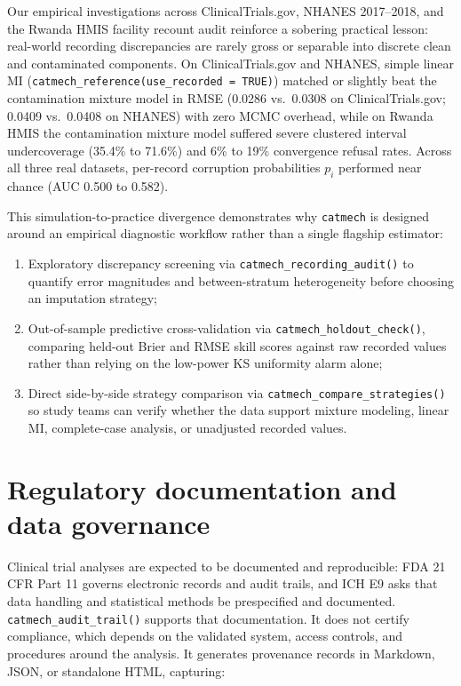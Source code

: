 \documentclass[
]{article}
\providecommand{\tightlist}{%
  \setlength{\itemsep}{0pt}\setlength{\parskip}{0pt}}
\begin{document}
Our empirical investigations across ClinicalTrials.gov, NHANES
2017--2018, and the Rwanda HMIS facility recount audit reinforce a
sobering practical lesson: real-world recording discrepancies are rarely
gross or separable into discrete clean and contaminated components. On
ClinicalTrials.gov and NHANES, simple linear MI
(\texttt{catmech\_reference(use\_recorded\ =\ TRUE)}) matched or
slightly beat the contamination mixture model in RMSE (0.0286 vs.~0.0308
on ClinicalTrials.gov; 0.0409 vs.~0.0408 on NHANES) with zero MCMC
overhead, while on Rwanda HMIS the contamination mixture model suffered
severe clustered interval undercoverage (35.4\% to 71.6\%) and 6\% to
19\% convergence refusal rates. Across all three real datasets,
per-record corruption probabilities \(p_i\) performed near chance (AUC
0.500 to 0.582).

This simulation-to-practice divergence demonstrates why \texttt{catmech}
is designed around an empirical diagnostic workflow rather than a single
flagship estimator:

\begin{enumerate}
\def\labelenumi{\arabic{enumi}.}
\tightlist
\item
  Exploratory discrepancy screening via
  \texttt{catmech\_recording\_audit()} to quantify error magnitudes and
  between-stratum heterogeneity before choosing an imputation strategy;
\item
  Out-of-sample predictive cross-validation via
  \texttt{catmech\_holdout\_check()}, comparing held-out Brier and RMSE
  skill scores against raw recorded values rather than relying on the
  low-power KS uniformity alarm alone;
\item
  Direct side-by-side strategy comparison via
  \texttt{catmech\_compare\_strategies()} so study teams can verify
  whether the data support mixture modeling, linear MI, complete-case
  analysis, or unadjusted recorded values.
\end{enumerate}

\section{Regulatory documentation and data
governance}\label{regulatory-documentation-and-data-governance}

Clinical trial analyses are expected to be documented and reproducible:
FDA 21 CFR Part 11 \citep{fda2003part11} governs electronic records and
audit trails, and ICH E9 \citep{ich1998e9} asks that data handling and
statistical methods be prespecified and documented.
\texttt{catmech\_audit\_trail()} supports that documentation. It does
not certify compliance, which depends on the validated system, access
controls, and procedures around the analysis. It generates provenance
records in Markdown, JSON, or standalone HTML, capturing:
\end{document}
